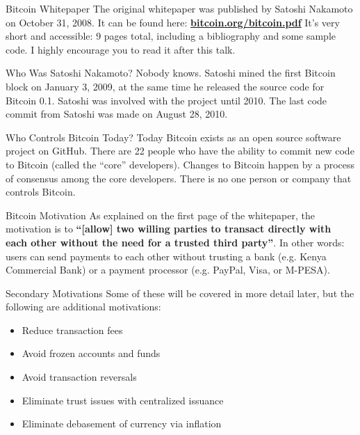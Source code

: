 \documentclass[14pt]{beamer}
\begin{document}
\begin{frame}{Bitcoin Whitepaper}
  The original whitepaper was published by Satoshi Nakamoto on October 31, 2008.
  It can be found here:
  \textbf{\href{https://bitcoin.org/bitcoin.pdf}{bitcoin.org/bitcoin.pdf}}
  \newline
  \newline
  It's very short and accessible: 9 pages total, including a bibliography and
  some sample code. I highly encourage you to read it after this talk.
\end{frame}

\begin{frame}{Who Was Satoshi Nakamoto?}
  Nobody knows.
  \newline
  \newline
  Satoshi mined the first Bitcoin block on January 3, 2009, at the same time he
  released the source code for Bitcoin 0.1.
  \newline
  \newline
  Satoshi was involved with the project until 2010.
  The last code commit from Satoshi was made on August 28, 2010.
\end{frame}

\begin{frame}{Who Controls Bitcoin Today?}
  Today Bitcoin exists as an open source software project on GitHub. There are
  22 people who have the ability to commit new code to Bitcoin (called the
  ``core'' developers).
  \newline
  \newline
  Changes to Bitcoin happen by a process of consensus among the core developers.
  There is no one person or company that controls Bitcoin.
\end{frame}


\begin{frame}{Bitcoin Motivation}
  As explained on the first page of the whitepaper, the motivation is to
  \textbf{``[allow] two willing parties to transact directly with each other
    without the need for a trusted third party''}.
  \newline
  \newline
  In other words: users can send payments to each other without trusting a bank
  (e.g. Kenya Commercial Bank) or a payment processor (e.g. PayPal, Visa, or
  M-PESA).
\end{frame}

\begin{frame}{Secondary Motivations}
  Some of these will be covered in more detail later, but the following are
  additional motivations:

  \begin{itemize}
  \item Reduce transaction fees
  \item Avoid frozen accounts and funds
  \item Avoid transaction reversals
  \item Eliminate trust issues with centralized issuance
  \item Eliminate debasement of currency via inflation
  \end{itemize}
\end{frame}
\end{document}
